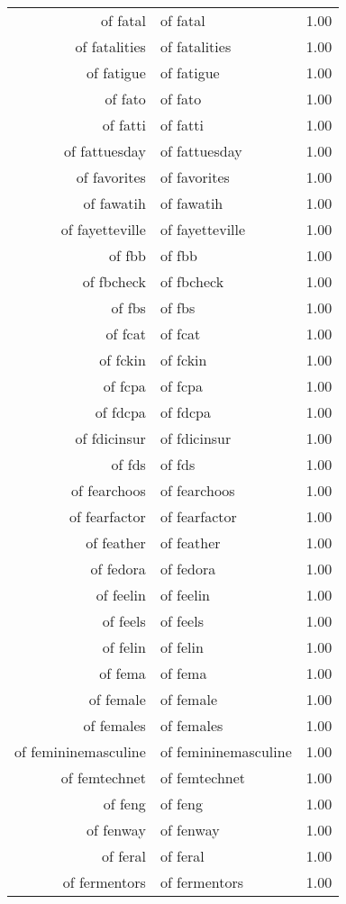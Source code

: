 \begin{table}[ht]
\begin{tabular}{rlr}
  of fatal & of fatal & 1.00 \\ 
  of fatalities & of fatalities & 1.00 \\ 
  of fatigue & of fatigue & 1.00 \\ 
  of fato & of fato & 1.00 \\ 
  of fatti & of fatti & 1.00 \\ 
  of fattuesday & of fattuesday & 1.00 \\ 
  of favorites & of favorites & 1.00 \\ 
  of fawatih & of fawatih & 1.00 \\ 
  of fayetteville & of fayetteville & 1.00 \\ 
  of fbb & of fbb & 1.00 \\ 
  of fbcheck & of fbcheck & 1.00 \\ 
  of fbs & of fbs & 1.00 \\ 
  of fcat & of fcat & 1.00 \\ 
  of fckin & of fckin & 1.00 \\ 
  of fcpa & of fcpa & 1.00 \\ 
  of fdcpa & of fdcpa & 1.00 \\ 
  of fdicinsur & of fdicinsur & 1.00 \\ 
  of fds & of fds & 1.00 \\ 
  of fearchoos & of fearchoos & 1.00 \\ 
  of fearfactor & of fearfactor & 1.00 \\ 
  of feather & of feather & 1.00 \\ 
  of fedora & of fedora & 1.00 \\ 
  of feelin & of feelin & 1.00 \\ 
  of feels & of feels & 1.00 \\ 
  of felin & of felin & 1.00 \\ 
  of fema & of fema & 1.00 \\ 
  of female & of female & 1.00 \\ 
  of females & of females & 1.00 \\ 
  of femininemasculine & of femininemasculine & 1.00 \\ 
  of femtechnet & of femtechnet & 1.00 \\ 
  of feng & of feng & 1.00 \\ 
  of fenway & of fenway & 1.00 \\ 
  of feral & of feral & 1.00 \\ 
  of fermentors & of fermentors & 1.00 \\ 

\end{tabular}
\end{table}
